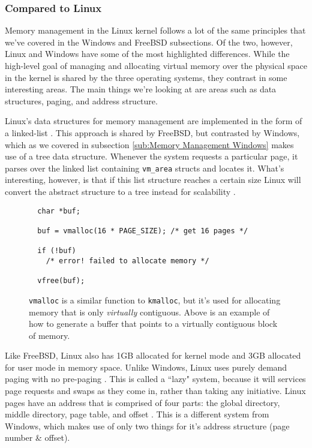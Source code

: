 \subsubsection{Compared to Linux}
\label{sub:Memory Management Linux}
\par Memory management in the Linux kernel follows a lot of the same principles that we've covered in the Windows and FreeBSD subsections.
Of the two, however, Linux and Windows have some of the most highlighted differences.
While the high-level goal of managing and allocating virtual memory over the physical space in the kernel is shared by the three operating systems, they contrast in some interesting areas.
The main things we're looking at are areas such as data structures, paging, and address structure.

\par Linux's data structures for memory management are implemented in the form of a linked-list \cite{linux:1}.
This approach is shared by FreeBSD, but contrasted by Windows, which as we covered in subsection \ref{sub:Memory Management Windows} makes use of a tree data structure.
Whenever the system requests a particular page, it parses over the linked list containing \texttt{vm\_area} structs and locates it.
What's interesting, however, is that if this list structure reaches a certain size Linux will convert the abstract structure to a tree instead for scalability \cite{linux:1}.

\begin{figure}[h]
\begin{lstlisting}
  char *buf;

  buf = vmalloc(16 * PAGE_SIZE); /* get 16 pages */

  if (!buf)
    /* error! failed to allocate memory */

  vfree(buf);
\end{lstlisting}
\centering
\captionsetup{justification=centering}
\caption{
  \texttt{vmalloc} is a similar function to \texttt{kmalloc}, but it's used for allocating memory that is only \textit{virtually} contiguous.
  Above is an example of how to generate a buffer that points to a virtually contiguous block of memory.
}
\label{code:vmalloc}
\end{figure}

\par Like FreeBSD, Linux also has 1GB allocated for kernel mode and 3GB allocated for user mode in memory space.
Unlike Windows, Linux uses purely demand paging with no pre-paging \cite{linux:1}.
This is called a ``lazy" system, because it will services page requests and swaps as they come in, rather than taking any initiative.
Linux pages have an address that is comprised of four parts: the global directory, middle directory, page table, and offset \cite{linux:1}.
This is a different system from Windows, which makes use of only two things for it's address structure (page number \& offset).



